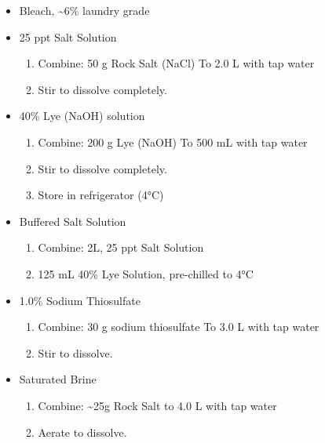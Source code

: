 \documentclass[
  letterpaper,
  DIV=11,
  numbers=noendperiod]{scrreprt}
\providecommand{\tightlist}{%
  \setlength{\itemsep}{0pt}\setlength{\parskip}{0pt}}\usepackage{longtable,booktabs,array}
\begin{document}
\begin{itemize}
\tightlist
\item
  Bleach, \textasciitilde6\% laundry grade
\item
  25 ppt Salt Solution

  \begin{enumerate}
  \def\labelenumi{\arabic{enumi}.}
  \tightlist
  \item
    Combine: 50 g Rock Salt (NaCl) To 2.0 L with tap water
  \item
    Stir to dissolve completely.
  \end{enumerate}
\item
  40\% Lye (NaOH) solution

  \begin{enumerate}
  \def\labelenumi{\arabic{enumi}.}
  \tightlist
  \item
    Combine: 200 g Lye (NaOH) To 500 mL with tap water
  \item
    Stir to dissolve completely.
  \item
    Store in refrigerator (4°C)
  \end{enumerate}
\item
  Buffered Salt Solution

  \begin{enumerate}
  \def\labelenumi{\arabic{enumi}.}
  \tightlist
  \item
    Combine: 2L, 25 ppt Salt Solution
  \item
    125 mL 40\% Lye Solution, pre-chilled to 4°C
  \end{enumerate}
\item
  1.0\% Sodium Thiosulfate

  \begin{enumerate}
  \def\labelenumi{\arabic{enumi}.}
  \tightlist
  \item
    Combine: 30 g sodium thiosulfate To 3.0 L with tap water
  \item
    Stir to dissolve.
  \end{enumerate}
\item
  Saturated Brine

  \begin{enumerate}
  \def\labelenumi{\arabic{enumi}.}
  \tightlist
  \item
    Combine: \textasciitilde25g Rock Salt to 4.0 L with tap water
  \item
    Aerate to dissolve.
  \end{enumerate}
\end{itemize}
\end{document}
